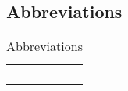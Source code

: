 \subsection{Abbreviations}

\begin{center}
\renewcommand{\arraystretch}{2}
\begin{longtable}{|m{3cm}|m{7.1cm}|}
\caption{Abbreviations}\\
\hline
\endfirsthead
\endhead
\hline
\endlastfoot
\hline
& \\
& \\
& \\
& \\
\hline
\end{longtable}
\end{center}